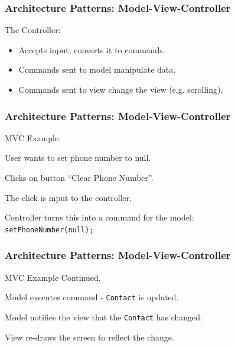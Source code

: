 \begin{frame}
\frametitle{Architecture Patterns: Model-View-Controller}

\begin{changemargin}{1cm}
The Controller:
\begin{itemize}
	\item Accepts input; converts it to commands.
	\item Commands sent to model manipulate data.
	\item Commands sent to view change the view (e.g. scrolling).
\end{itemize}

\end{changemargin}
\end{frame}

\begin{frame}
\frametitle{Architecture Patterns: Model-View-Controller}

\begin{changemargin}{1cm}
MVC Example.

User wants to set phone number to null.

Clicks on button ``Clear Phone Number''.

The click is input to the controller.

Controller turns this into a command for the model:\\
	\quad \texttt{setPhoneNumber(null);}

\end{changemargin}
\end{frame}

\begin{frame}
\frametitle{Architecture Patterns: Model-View-Controller}

\begin{changemargin}{1cm}
MVC Example Continued.

Model executes command - \texttt{Contact} is updated.

Model notifies the view that the \texttt{Contact} has changed.

View re-draws the screen to reflect the change.
\end{changemargin}
\end{frame}


